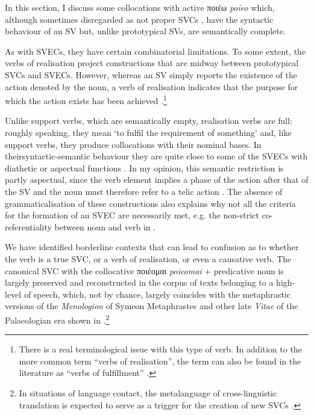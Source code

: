 \documentclass[output=paper,colorlinks,citecolor=brown]{langscibook}
\begin{document}
In this section, I discuss some collocations with active ποιέω \emph{poieo} which,
although sometimes disregarded as not proper SVCs
\parencite[113--115]{AlonsoRamosMargarita-2004672}, have the syntactic behaviour of an SV
but, unlike prototypical SVs, are semantically complete.



As with SVECs, they have certain combinatorial limitations. To some extent, the verbs of
realisation project constructions that are midway between prototypical SVCs and SVECs.
However, whereas an SV simply reports the existence of the action denoted by the noun, a
verb of realisation indicates that the purpose for which the action exists has been
achieved \parencite[113--115]{AlonsoRamosMargarita-2004672}.\footnote{There is a real
  terminological issue with this type of verb. In addition to the more common term ``verbs
  of realisation'', the term can also be found in the literature as ``verbs of fulfillment''
  \parencite{MelcukIgor-2004540}.}

Unlike support verbs, which are semantically empty, realisation verbs are full: roughly
speaking, they mean `to fulfil the requirement of something' and, like support verbs, they
produce collocations with their nominal bases. In their\linebreak syntactic-semantic
behaviour they are quite close to some of the SVECs with diathetic or aspectual functions
\parencite{MelcukIgor-2022555}. In my opinion, this semantic restriction is partly
aspectual, since the verb element implies a phase of the action after that of the SV and
the noun must therefore refer to a telic action \parencite{GrossMaurice-199846}. The absence of grammaticalisation of these constructions \citep{ButtMiriam-2010672} also explains why not all
the criteria for the formation of an SVEC are necessarily met, e.g. the non-strict
co-referentiality between noun and verb in .

\largerpage
We have identified borderline contexts that can lead to confusion as to whether the verb
is a true SVC, or a verb of realisation, or even a causative verb. The canonical SVC with
the collocative ποιέομαι \emph{poieomai} + predicative noun is largely preserved and
reconstructed in the corpus of texts belonging to a high-level of speech, which, not by
chance, largely coincides with the metaphrastic versions of the \emph{Menologion} of
Symeon Metaphrastes and other late \emph{Vitae} of the Palaeologian era shown in
.\footnote{In situations of language contact, the metalanguage of
  cross-linguistic translation is expected to serve as a trigger for the creation of new
  SVCs
  \parencites{FendelVictoria-2021854,BanosJoséMiguelandMaríaDoloresJiménezLópez-2018477}.}
\end{document}
